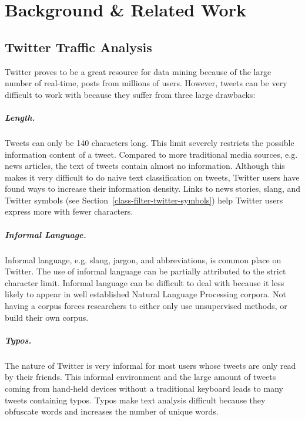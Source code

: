 \documentclass[12pt]{ucthesis}
\begin{document}
\chapter{Background \& Related Work}
\label{background-related-work}


\section{Twitter Traffic Analysis}
\label{background-twitter}
Twitter proves to be a great resource for data mining because of the large number of real-time, posts from millions of users.
However, tweets can be very difficult to work with because they suffer from three large drawbacks:

\paragraph{Length.}
Tweets can only be 140 characters long. This limit severely restricts the possible information content of a tweet.
Compared to more traditional media sources, e.g. news articles, the text of tweets contain almost no information.
Although this makes it very difficult to do naive text classification on tweets, Twitter users have found ways to increase their information density.
Links to news stories, slang, and Twitter symbols (see Section~\ref{class-filter-twitter-symbols}) help Twitter users express more with fewer characters.

\paragraph{Informal Language.}
Informal language, e.g. slang, jargon, and abbreviations, is common place on Twitter.
The use of informal language can be partially attributed to the strict character limit.
Informal language can be difficult to deal with because it less likely to appear in well established
Natural Language Processing corpora. Not having a corpus forces researchers to either only use unsupervised methods, or
build their own corpus.

\paragraph{Typos.}
The nature of Twitter is very informal for most users whose tweets are only read by their friends.
This informal environment and the large amount of tweets coming from hand-held devices without a traditional keyboard leads to many tweets containing typos.
Typos make text analysis difficult because they obfuscate words and increases the number of unique words.
\end{document}
